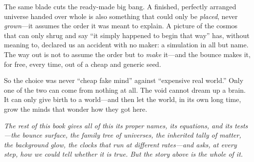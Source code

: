 The same blade cuts the ready-made big bang. A finished, perfectly arranged
universe handed over whole is also something that could only be \emph{placed},
never \emph{grown}---it assumes the order it was meant to explain. A picture of the
cosmos that can only shrug and say ``it simply happened to begin that way'' has,
without meaning to, declared us an accident with no maker: a simulation in all but
name. The way out is not to assume the order but to \emph{make} it---and the
bounce makes it, for free, every time, out of a cheap and generic seed.

So the choice was never ``cheap fake mind'' against ``expensive real world.'' Only
one of the two can come from nothing at all. The void cannot dream up a brain. It
can only give birth to a world---and then let the world, in its own long time,
grow the minds that wonder how they got here.

\bigskip
\noindent\emph{The rest of this book gives all of this its proper names, its
equations, and its tests---the bounce surface, the family tree of universes, the
inherited tally of matter, the background glow, the clocks that run at different
rates---and asks, at every step, how we could tell whether it is true. But the
story above is the whole of it.}
